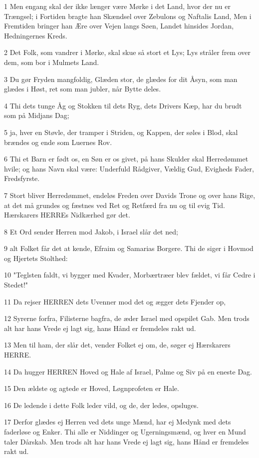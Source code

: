 \par 1 Men engang skal der ikke længer være Mørke i det Land, hvor der nu er Trængsel; i Fortiden bragte han Skændsel over Zebulons og Naftalis Land, Men i Fremtiden bringer han Ære over Vejen langs Søen, Landet hinsides Jordan, Hedningernes Kreds.
\par 2 Det Folk, som vandrer i Mørke, skal skue så stort et Lys; Lys stråler frem over dem, som bor i Mulmets Land.
\par 3 Du gør Fryden mangfoldig, Glæden stor, de glædes for dit Åsyn, som man glædes i Høst, ret som man jubler, når Bytte deles.
\par 4 Thi dets tunge Åg og Stokken til dets Ryg, dets Drivers Kæp, har du brudt som på Midjans Dag;
\par 5 ja, hver en Støvle, der tramper i Striden, og Kappen, der søles i Blod, skal brændes og ende som Luernes Rov.
\par 6 Thi et Barn er født os, en Søn er os givet, på hans Skulder skal Herredømmet hvile; og hans Navn skal være: Underfuld Rådgiver, Vældig Gud, Evigheds Fader, Fredsfyrste.
\par 7 Stort bliver Herredømmet, endeløs Freden over Davids Trone og over hans Rige, at det må grundes og fæstnes ved Ret og Retfærd fra nu og til evig Tid. Hærskarers HERREs Nidkærhed gør det.
\par 8 Et Ord sender Herren mod Jakob, i Israel slår det ned;
\par 9 alt Folket får det at kende, Efraim og Samarias Borgere. Thi de siger i Hovmod og Hjertets Stolthed:
\par 10 "Teglsten faldt, vi bygger med Kvader, Morbærtræer blev fældet, vi får Cedre i Stedet!"
\par 11 Da rejser HERREN dets Uvenner mod det og ægger dets Fjender op,
\par 12 Syrerne forfra, Filisterne bagfra, de æder Israel med opspilet Gab. Men trods alt har hans Vrede ej lagt sig, hans Hånd er fremdeles rakt ud.
\par 13 Men til ham, der slår det, vender Folket ej om, de, søger ej Hærskarers HERRE.
\par 14 Da hugger HERREN Hoved og Hale af Israel, Palme og Siv på en eneste Dag.
\par 15 Den ældste og agtede er Hoved, Løgnprofeten er Hale.
\par 16 De ledende i dette Folk leder vild, og de, der ledes, opsluges.
\par 17 Derfor glædes ej Herren ved dets unge Mænd, har ej Medynk med dets faderløse og Enker. Thi alle er Niddinger og Ugerningsmænd, og hver en Mund taler Dårskab. Men trods alt har hans Vrede ej lagt sig, hans Hånd er fremdeles rakt ud.
